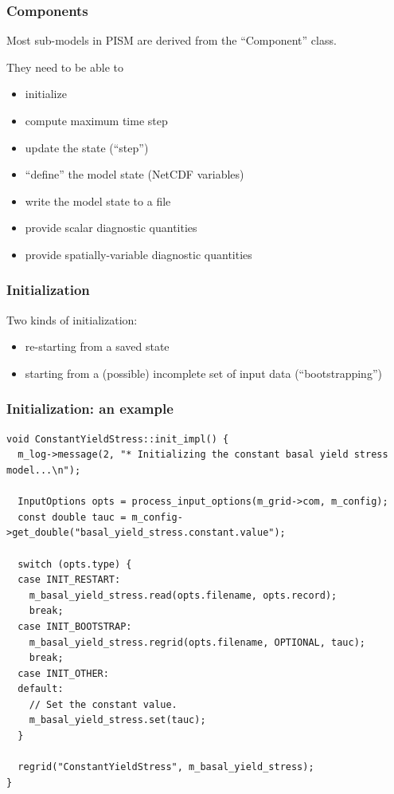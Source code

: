\documentclass[hide notes,intlimits]{beamer}
\begin{document}
\begin{frame}
  \frametitle{Components}

  Most sub-models in PISM are derived from the ``Component'' class.

  They need to be able to
  \begin{itemize}
  \item initialize
  \item compute maximum time step
  \item update the state (``step'')
  \item ``define'' the model state (NetCDF variables)
  \item write the model state to a file
  \item<2> provide scalar diagnostic quantities
  \item<2> provide spatially-variable diagnostic quantities
  \end{itemize}
  
\end{frame}

\begin{frame}
  \frametitle{Initialization}

  Two kinds of initialization:
  \begin{itemize}
  \item re-starting from a saved state
  \item starting from a (possible) incomplete set of input data
    (``bootstrapping'')
  \end{itemize}
\end{frame}

\begin{frame}
  \frametitle{Initialization: an example}
\begin{lstlisting}
void ConstantYieldStress::init_impl() {
  m_log->message(2, "* Initializing the constant basal yield stress model...\n");

  InputOptions opts = process_input_options(m_grid->com, m_config);
  const double tauc = m_config->get_double("basal_yield_stress.constant.value");

  switch (opts.type) {
  case INIT_RESTART:
    m_basal_yield_stress.read(opts.filename, opts.record);
    break;
  case INIT_BOOTSTRAP:
    m_basal_yield_stress.regrid(opts.filename, OPTIONAL, tauc);
    break;
  case INIT_OTHER:
  default:
    // Set the constant value.
    m_basal_yield_stress.set(tauc);
  }

  regrid("ConstantYieldStress", m_basal_yield_stress);
}
\end{lstlisting}
\end{frame}
\end{document}
